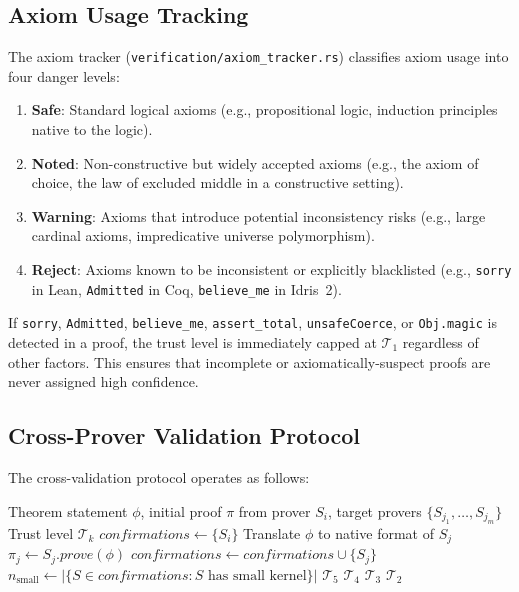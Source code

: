 \documentclass[11pt,a4paper]{article}
\newcommand{\trustlevel}[1]{\ensuremath{\mathcal{T}_{#1}}}
\begin{document}
\subsection{Axiom Usage Tracking}

The axiom tracker (\texttt{verification/axiom\_tracker.rs}) classifies axiom
usage into four danger levels:

\begin{enumerate}
  \item \textbf{Safe}: Standard logical axioms (e.g., propositional logic,
  induction principles native to the logic).
  \item \textbf{Noted}: Non-constructive but widely accepted axioms (e.g.,
  the axiom of choice, the law of excluded middle in a constructive setting).
  \item \textbf{Warning}: Axioms that introduce potential inconsistency risks
  (e.g., large cardinal axioms, impredicative universe polymorphism).
  \item \textbf{Reject}: Axioms known to be inconsistent or explicitly
  blacklisted (e.g., \texttt{sorry} in Lean, \texttt{Admitted} in Coq,
  \texttt{believe\_me} in Idris~2).
\end{enumerate}

If \texttt{sorry}, \texttt{Admitted}, \texttt{believe\_me},
\texttt{assert\_total}, \texttt{unsafeCoerce}, or \texttt{Obj.magic} is
detected in a proof, the trust level is immediately capped at $\trustlevel{1}$
regardless of other factors. This ensures that incomplete or
axiomatically-suspect proofs are never assigned high confidence.

\subsection{Cross-Prover Validation Protocol}

The cross-validation protocol operates as follows:

\begin{algorithm}[htbp]
\caption{Cross-Prover Validation}
\label{alg:cross-validation}
\begin{algorithmic}[1]
\Require Theorem statement $\phi$, initial proof $\pi$ from prover $S_i$, target provers $\{S_{j_1}, \ldots, S_{j_m}\}$
\Ensure Trust level $\trustlevel{k}$
\State $\mathit{confirmations} \gets \{S_i\}$
  \State Translate $\phi$ to native format of $S_j$
  \State $\pi_j \gets S_j.\mathit{prove}(\phi)$ 
    \State $\mathit{confirmations} \gets \mathit{confirmations} \cup \{S_j\}$
  \EndIf
\EndFor
\State $n_{\text{small}} \gets |\{S \in \mathit{confirmations} : S \text{ has small kernel}\}|$
  \State \Return $\trustlevel{5}$
  \State \Return $\trustlevel{4}$
  \State \Return $\trustlevel{3}$
\Else
  \State \Return $\trustlevel{2}$
\EndIf
\end{algorithmic}
\end{algorithm}
\end{document}
